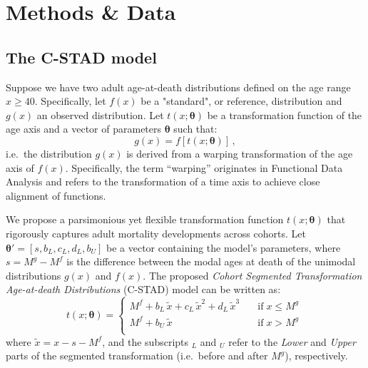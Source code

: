 \documentclass[11pt, a4paper]{article}
\begin{document}
\section{Methods \& Data}
\label{Sec:Methods}
\subsection{The C-STAD model}
\label{Subsec:C-STADmodel}
Suppose we have two adult age-at-death distributions defined on the age range $x \geq 40$. Specifically, let $f(x)$ be a "standard", or reference, distribution and $g(x)$ an observed distribution. Let $t(x;\bm{\theta})$ be a transformation function of the age axis and a vector of parameters $\bm{\theta}$ such that:
%
\begin{equation}\label{Eq:gxftx}
g(x) = f\left[t(x;\bm{\theta})\right]\,, 
\end{equation}  
%
i.e.~the distribution $g(x)$ is derived from a warping transformation of the age axis of $f(x)$. Specifically, the term ``warping'' originates in Functional Data Analysis \citep{ramsay2005FDA} and refers to the transformation of a time axis to achieve close alignment of functions. 

We propose a parsimonious yet flexible transformation function $t(x;\bm{\theta})$ that rigorously captures adult mortality developments across cohorts. Let $\bm{\theta}' = \left[s,b_{L},c_{L},d_{L},b_{U}\right]$ be a vector containing the model's parameters, where $s = M^{g} - M^{f}$ is the difference between the modal ages at death of the unimodal distributions $g(x)$ and $f(x)$. The proposed \emph{Cohort Segmented Transformation Age-at-death Distributions} (C-STAD) model can be written as: 
%
\begin{equation}\label{Eq:tx}
t(x;\bm{\theta}) = \left\{ \begin{array}{ll}
M^{f} + b_{L}\,\tilde{x} + c_{L}\,\tilde{x}^2 + d_{L}\,\tilde{x}^3 \quad & \mathrm{if} \; x \leq M^{g} \, \\
M^{f} + b_{U}\,\tilde{x} \quad & \mathrm{if} \; x > M^{g} \\
\end{array}
\right.
\end{equation} 
%
where $\tilde{x}=x - s - M^{f}$, and the subscripts $_L$ and $_U$ refer to the \textit{Lower} and \textit{Upper} parts of the segmented transformation (i.e.~before and after $M^{g}$), respectively. 
\end{document}
